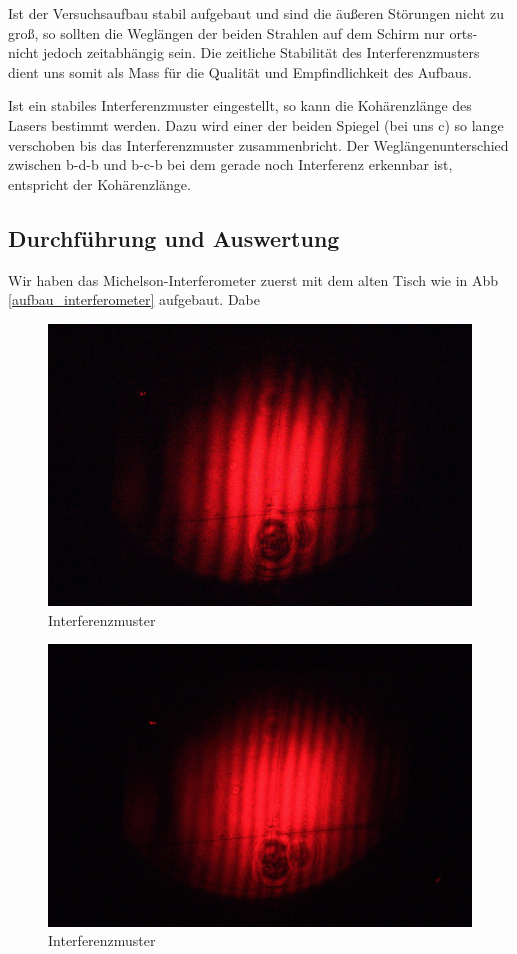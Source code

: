 Ist der Versuchsaufbau stabil aufgebaut und sind die äußeren Störungen nicht zu groß, so sollten die Weglängen der beiden Strahlen auf dem Schirm nur orts- nicht jedoch zeitabhängig sein. Die zeitliche Stabilität des Interferenzmusters dient uns somit als Mass für die Qualität und Empfindlichkeit des Aufbaus.

Ist ein stabiles Interferenzmuster eingestellt, so kann die Kohärenzlänge des Lasers bestimmt werden. Dazu wird einer der beiden Spiegel (bei uns c) so lange verschoben bis das Interferenzmuster zusammenbricht. Der Weglängenunterschied zwischen b-d-b und b-c-b bei dem gerade noch Interferenz erkennbar ist, entspricht der Kohärenzlänge.


\subsection{Durchführung und Auswertung}

Wir haben das Michelson-Interferometer zuerst mit dem alten Tisch wie in Abb \ref{aufbau_interferometer} aufgebaut. Dabe
\begin{figure}[ht]
 \includegraphics[width=\textwidth]{Photos/IMG_3881.jpg}
 \caption{Interferenzmuster}
\end{figure}


\begin{figure}[ht]
 \includegraphics[width=\textwidth]{Photos/IMG_3887.jpg}
 \caption{Interferenzmuster}
\end{figure}